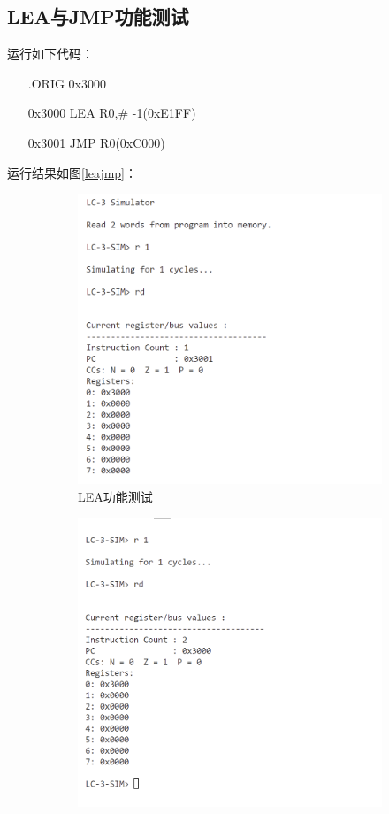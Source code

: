 \documentclass[UTF8]{ctexart}
\begin{document}
\subsection{LEA与JMP功能测试}
运行如下代码：
\begin{enumerate}
  \item [ ] .ORIG 0x3000
  \item [0x3000] LEA R0,\# -1(0xE1FF)
  \item [0x3001] JMP R0(0xC000)
\end{enumerate}
运行结果如图\ref{leajmp}：
\begin{figure}[htbp]
  \centering
  \begin{subfigure}{0.48\textwidth} %
    \includegraphics[width=\linewidth]{lea.png}
    \caption{LEA功能测试}
  \end{subfigure}
  \hfill
  \begin{subfigure}{0.48\textwidth}
    \includegraphics[width=\linewidth]{jmp.png}

\end{subfigure}
\end{figure}
\end{document}
